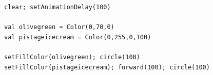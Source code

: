   

\begin{lstlisting}[basicstyle={\ttfamily\fontsize{16}{19}\selectfont},numbers=none]
clear; setAnimationDelay(100)      

val olivegreen = Color(0,70,0)
val pistageicecream = Color(0,255,0,100)

setFillColor(olivegreen); circle(100)
setFillColor(pistageicecream); forward(100); circle(100)
\end{lstlisting}
        
